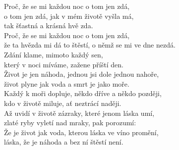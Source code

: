 \nv{}Proč, že se mi každou noc o tom jen zdá,\\
o tom jen zdá, jak v mém životě vyšla má,\\
tak šťastná a krásná hvě zda.\\
Proč, že se mi každou noc o tom jen zdá,\\
že ta hvězda mi dá to štěstí, o němž se mi ve dne nezdá.
\vnv\\
Zdání klame, mimoto každý sen,\\
který v noci \mm mí\mm váme, zažene příští den. 
\vnv\\
Život je jen náhoda, jednou jsi dole jednou nahoře,\\
život plyne jak voda a smrt je jako moře. \\
Každý k moři dopluje, někdo dříve a někdo později,\\
kdo v životě miluje, ať neztrácí naději.\sm{}
\vnv\\
Až uvidí v životě zázraky, které jenom láska umí,\\
zlaté ryby vyletí nad mraky, pak porozumí:
\vnv\\
Že je život jak voda, kterou láska ve víno promění,\\
láska, že je náhoda a bez ní štěstí není.
\newpage
